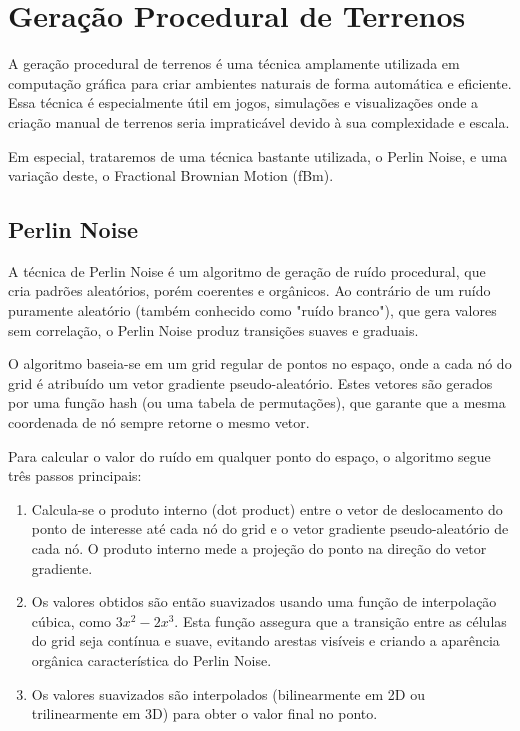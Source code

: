 \section{Geração Procedural de Terrenos}
\label{sec:terrenos}

A geração procedural de terrenos é uma técnica amplamente utilizada em computação gráfica para criar ambientes naturais de forma automática e eficiente. Essa técnica é especialmente útil em jogos, simulações e visualizações onde a criação manual de terrenos seria impraticável devido à sua complexidade e escala.

Em especial, trataremos de uma técnica bastante utilizada, o Perlin Noise, e uma variação deste, o Fractional Brownian Motion (fBm).

\subsection{Perlin Noise}

A técnica de Perlin Noise é um algoritmo de geração de ruído procedural, que cria padrões aleatórios, porém coerentes e orgânicos. Ao contrário de um ruído puramente aleatório (também conhecido como "ruído branco"), que gera valores sem correlação, o Perlin Noise produz transições suaves e graduais.

O algoritmo baseia-se em um grid regular de pontos no espaço, onde a cada nó do grid é atribuído um vetor gradiente pseudo-aleatório. Estes vetores são gerados por uma função hash (ou uma tabela de permutações), que garante que a mesma coordenada de nó sempre retorne o mesmo vetor.

Para calcular o valor do ruído em qualquer ponto do espaço, o algoritmo segue três passos principais:
\begin{enumerate}
    \item Calcula-se o produto interno (dot product) entre o vetor de deslocamento do ponto de interesse até cada nó do grid e o vetor gradiente pseudo-aleatório de cada nó. O produto interno mede a projeção do ponto na direção do vetor gradiente.
    \item Os valores obtidos são então suavizados usando uma função de interpolação cúbica, como $3x^2 - 2x^3$. Esta função assegura que a transição entre as células do grid seja contínua e suave, evitando arestas visíveis e criando a aparência orgânica característica do Perlin Noise.
    \item Os valores suavizados são interpolados (bilinearmente em 2D ou trilinearmente em 3D) para obter o valor final no ponto.
\end{enumerate}

